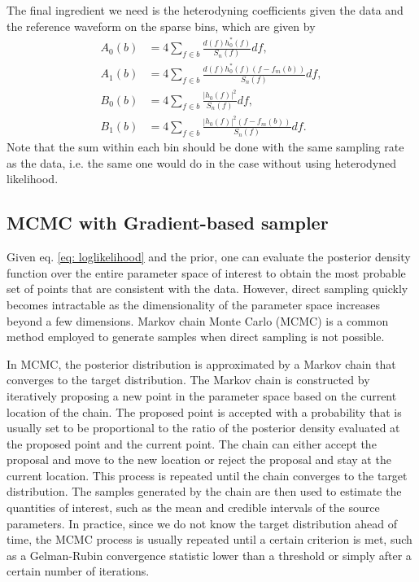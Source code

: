 \documentclass[twocolumn]{aastex631}
\begin{document}
The final ingredient we need is the heterodyning coefficients given the data and
the reference waveform on the sparse bins, which are given by
\begin{align}
    A_0(b) &= 4 \sum_{f \in b} \frac{d(f)h^*_0(f)}{S_n(f)} df, \\
    A_1(b) &= 4 \sum_{f \in b} \frac{d(f)h^*_0(f)(f-f_m(b))}{S_n(f)} df, \\
    B_0(b) &= 4 \sum_{f \in b} \frac{|h_0(f)|^2}{S_n(f)} df, \\
    B_1(b) &= 4 \sum_{f \in b} \frac{|h_0(f)|^2(f-f_m(b))}{S_n(f)} df.
\end{align}
Note that the sum within each bin should be done with the same sampling rate as
the data, i.e. the same one would do in the case without using heterodyned
likelihood.

\subsection{MCMC with Gradient-based sampler}
\label{sec:gradient}

Given eq. \ref{eq: loglikelihood} and the prior, one can evaluate the posterior
density function over the entire parameter space of interest to obtain the most
probable set of points that are consistent with the data. However, direct
sampling quickly becomes intractable as the dimensionality of the parameter
space increases beyond a few dimensions. Markov chain Monte Carlo (MCMC) is a
common method employed to generate samples when direct sampling is not possible.

In MCMC, the posterior distribution is approximated by a Markov chain that
converges to the target distribution. The Markov chain is constructed by
iteratively proposing a new point in the parameter space based on the current
location of the chain. The proposed point is accepted with a probability that is
usually set to be proportional to the ratio of the posterior density evaluated
at the proposed point and the current point. The chain can either accept the
proposal and move to the new location or reject the proposal and stay at the
current location. This process is repeated until the chain converges to the
target distribution. The samples generated by the chain are then used to
estimate the quantities of interest, such as the mean and credible intervals of
the source parameters. In practice, since we do not know the target distribution
ahead of time, the MCMC process is usually repeated until a certain criterion is
met, such as a Gelman-Rubin convergence statistic \cite{Gelman-rhat} lower than
a threshold or simply after a certain number of iterations.
\end{document}
